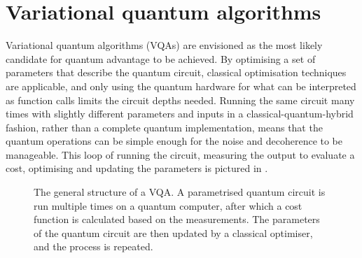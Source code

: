 \section{Variational quantum algorithms}
\label{sec:vqa}
Variational quantum algorithms (VQAs) are envisioned as the most likely candidate for quantum advantage to be achieved.
By optimising a set of parameters that describe the quantum circuit, classical optimisation techniques are applicable, and only using the quantum hardware for what can be interpreted as function calls limits the circuit depths needed.
Running the same circuit many times with slightly different parameters and inputs in a classical-quantum-hybrid fashion, rather than a complete quantum implementation, means that the quantum operations can be simple enough for the noise and decoherence to be manageable.
This loop of running the circuit, measuring the output to evaluate a cost, optimising and updating the parameters is pictured in .

\begin{figure}
    \centering
    \caption{
        The general structure of a VQA.
        A parametrised quantum circuit is run multiple times on a quantum computer, after which a cost function is calculated based on the measurements.
        The parameters of the quantum circuit are then updated by a classical optimiser, and the process is repeated.
    }
    \label{fig:vqa}
\end{figure}

